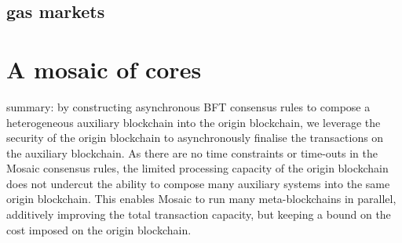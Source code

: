 \documentclass[12pt,a4paper]{article}
\begin{document}
\subsection{gas markets}

%
%
\section{A mosaic of cores}

summary: by constructing asynchronous BFT consensus rules to compose a heterogeneous auxiliary blockchain into the origin blockchain, we leverage the security of the origin blockchain to asynchronously finalise the transactions on the auxiliary blockchain.  As there are no time constraints or time-outs in the Mosaic consensus rules, the limited processing capacity of the origin blockchain does not undercut the ability to compose many auxiliary systems into the same origin blockchain.  This enables Mosaic to run many meta-blockchains in parallel, additively improving the total transaction capacity, but keeping a bound on the cost imposed on the origin blockchain.
%
%
\end{document}

